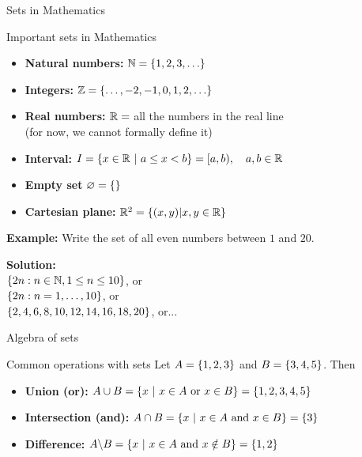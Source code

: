 \documentclass[9pt]{beamer}
\begin{document}
\begin{frame}{Sets in Mathematics}

    \begin{block}{Important sets in Mathematics}
        \begin{itemize}[leftmargin = 0.5cm, label = $\bullet$, rightmargin = 0.2cm]
            \item \textbf{Natural numbers:} $\N = \lrc{1, 2, 3, \dots}$
            \item \textbf{Integers:} $\Z = \lrc{\dots, -2, -1, 0, 1, 2, \dots}$
            \item \textbf{Real numbers:} $\mathbb{R} = $ all the numbers in the real line \\
                                        (for now, we cannot formally define it)
            \item \textbf{Interval:} $I = \left\{ x \in \mathbb{R}\ |\ a \leq x < b \right\} = [a, b),\quad a, b\in\mathbb{R}$ 
            \item \textbf{Empty set} $\varnothing = \left\{\right\}$
            \item \textbf{Cartesian plane:} $\mathbb{R}^2 = \left\{(x, y) | x, y \in \mathbb{R}\right\}$ 
        \end{itemize}
    \end{block}

    \textbf{Example:} Write the set of all even numbers between $1$ and $20$.
    
    \textbf{Solution:} \\
    $\left\{2n : n\in\mathbb{N}, 1\leq n \leq 10\right\}$, or\\ 
    $\left\{2n : n = 1,\dots,10\right\}$, or\\
    $\left\{2,4,6,8,10,12,14,16,18,20\right\}$, or... 
    
\end{frame}

\begin{frame}{Algebra of sets}

    \begin{block}{Common operations with sets}
        Let $A = \left\{1, 2, 3\right\}$ and $B = \left\{3, 4, 5\right\}$. Then
        \begin{itemize}[leftmargin = 0.5cm, label = $\bullet$]
            \item \textbf{Union (or):} $A \cup B = \left\{ x\ |\ x\in A \text{ or } x\in B\right\} = \left\{1, 2, 3, 4, 5\right\}$
            \item \textbf{Intersection (and):} $A \cap B = \left\{ x\ |\ x\in A \text{ and } x\in B\right\} = \left\{3\right\}$
            \item \textbf{Difference:} $A \backslash B = \left\{ x\ |\ x\in A \text{ and } x\notin B\right\} = \left\{1, 2\right\}$
        \end{itemize}
    \end{block}
    
\end{frame}
\end{document}

